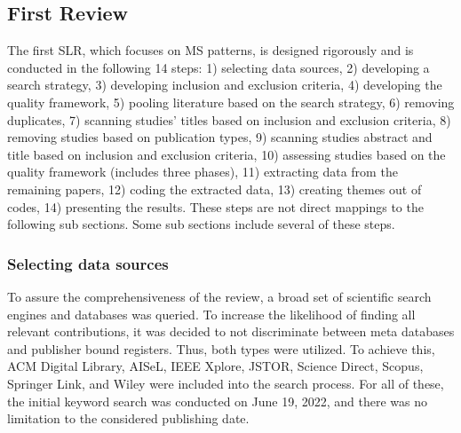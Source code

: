 \documentclass{bmcart}
\begin{document}



\subsection{First Review} \label{firstReview}

The first SLR, which focuses on MS patterns, is designed rigorously and is conducted in the following 14 steps: 1) selecting data sources, 2) developing a search strategy, 3) developing inclusion and exclusion criteria, 4) developing the quality framework, 5) pooling literature based on the search strategy, 6) removing duplicates, 7) scanning studies' titles based on inclusion and exclusion criteria, 8) removing studies based on publication types, 9) scanning studies abstract and title based on inclusion and exclusion criteria, 10) assessing studies based on the quality framework (includes three phases), 11) extracting data from the remaining papers, 12) coding the extracted data, 13) creating themes out of codes, 14) presenting the results. These steps are not direct mappings to the following sub sections. Some sub sections include several of these steps.


\subsubsection{Selecting data sources}

To assure the comprehensiveness of the review, a broad set of scientific search engines and databases was queried. To increase the likelihood of finding all relevant contributions, it was decided to not discriminate between meta databases and publisher bound registers. Thus, both types were utilized. To achieve this, ACM Digital Library, AISeL, IEEE Xplore, JSTOR, Science Direct, Scopus, Springer Link, and Wiley were included into the search process. For all of these, the initial keyword search was conducted on June 19, 2022, and there was no limitation to the considered publishing date.
\end{document}
